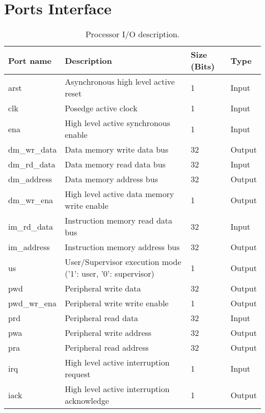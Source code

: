 \section{Ports Interface}
\label{sec:ports}
\begin{table}
\begin{center}
\begin{tabu} to \textwidth {|X[l]|X[2.5,l]|X[c]|X[c]|}
\hline
\rowfont[c]\bfseries
Port name & Description & Size (Bits) & Type\\
\hline
\hline
arst         & Asynchronous high level active reset         & 1  & Input   \\
\hline
clk          & Posedge active clock                         & 1  & Input   \\
\hline
ena          & High level active synchronous enable         & 1  & Input   \\
\hline
dm\_wr\_data & Data memory write data bus                   & 32 & Output  \\
\hline
dm\_rd\_data & Data memory read data bus                    & 32 & Input   \\
\hline
dm\_address  & Data memory address bus                      & 32 & Output  \\
\hline
dm\_wr\_ena  & High level active data memory write enable   & 1  & Output  \\
\hline
im\_rd\_data & Instruction memory read data bus             & 32 & Input   \\
\hline
im\_address  & Instruction memory address bus               & 32 & Output  \\
\hline
us           & User/Supervisor execution mode ('1': user, '0': supervisor)  & 1  & Output  \\
\hline
pwd          & Peripheral write data                        & 32 & Output  \\
\hline
pwd\_wr\_ena & Peripheral write write enable                & 1  & Output  \\
\hline
prd          & Peripheral read data                         & 32 & Input   \\
\hline
pwa          & Peripheral write address                     & 32 & Output  \\
\hline
pra          & Peripheral read address                      & 32 & Output  \\
\hline
irq          & High level active interruption request       & 1  & Input   \\
\hline
iack         & High level active interruption acknowledge   & 1  & Output   \\
\hline
\end{tabu}
\label{tbl:ports}
\caption{Processor I/O description.}
\end{center}
\end{table}
